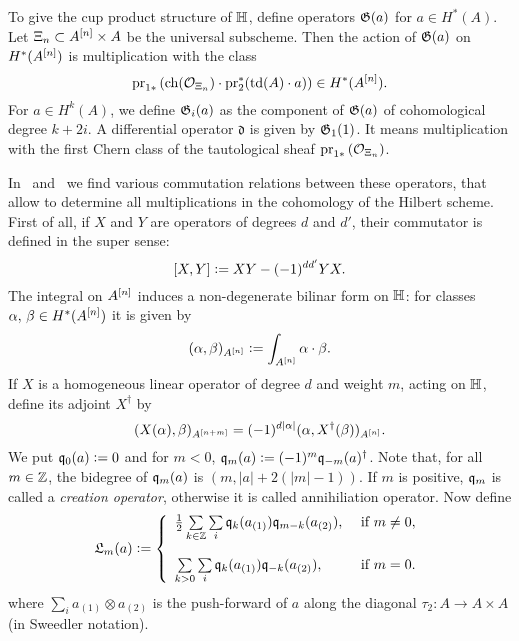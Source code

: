 \begin{definition}
To give the cup product structure of $\mathbb{H}$, define operators $\mathfrak{G}(a)$ for $a \in H^*(A)$. Let $\Xi_n \subset A^{[n]}\times A$ be the universal subscheme. Then the action of $\mathfrak{G}(a)$ on $H^*(A^{[n]})$ is multiplication with the class
$$
\operatorname{pr}_{1*}\left( \operatorname{ch}(\mathcal{O}_{\Xi_n})\cdot \operatorname{pr}_2^*(\operatorname{td}(A)\cdot a) \right) \in H^*(A^{[n]}).
$$
For $a \in H^k(A)$, we define $\mathfrak{G}_i(a)$ as the component of $\mathfrak{G}(a)$ of cohomological degree $k+2i$. A differential operator $\mathfrak{d}$ is given by $\mathfrak{G}_1(1)$. It means multiplication with the first Chern class of the tautological sheaf $\operatorname{pr}_{1*}\left( \mathcal{O}_{\Xi_n}\right)$.
\end{definition}
In~\cite{LehnSorger} and~\cite{LiQinWang} we find various commutation relations between these operators, that allow to determine all multiplications in the cohomology of the Hilbert scheme. First of all, if $X$ and $Y$ are operators of degrees $d$ and $d'$, their commutator is defined in the super sense: 
$$
[X,Y] \vcentcolon=  XY - (-1)^{dd'}YX.
$$
The integral on $A^{[n]}$ induces a non-degenerate bilinar form on $\mathbb{H}$: for classes $\alpha,\,\beta\in H^*(A^{[n]})$ it is given by
$$
(\alpha,\beta)_{A^{[n]}} \vcentcolon=   \int_{A^{[n]}}\alpha\cdot\beta.
$$
If $X$ is a homogeneous linear operator of degree $d$ and weight $m$, acting on $\mathbb{H}$, define its adjoint $X^\dagger$ by
$$
(X(\alpha),\beta)_{A^{[n+m]}}  = (-1)^{d|\alpha|}( \alpha , X^\dagger (\beta))_{A^{[n]}}.
$$
We put $\mathfrak{q}_0(a) \vcentcolon= 0$ and for $m<0$, $\mathfrak{q}_m(a) \vcentcolon=  (-1)^m \mathfrak{q}_{-m}(a)^\dagger$. Note that, for all $m\in\mathbb{Z}$, the bidegree of $\mathfrak{q}_m(a)$ is $(m,|a| + 2(|m|-1))$. If $m$ is positive, $\mathfrak{q}_m$ is called a \emph{creation operator}, otherwise it is called annihiliation operator. Now define
$$
\mathfrak{L}_m(a) \defIs  \left\{ 
\begin{array}{ll}
 \tfrac{1}{2}\sum\limits_{k\in\Z}\sum\limits_{i}\q_k( a_{(1)})\q_{m-k}( a_{(2)}), & \text{ if } m\neq 0, \vspace{4mm}\\
 \sum\limits_{k>0}\sum\limits_{i}\q_k( a_{(1)})\q_{-k}( a_{(2)}), & \text{ if } m= 0. \\
\end{array}
\right.
$$
where $\sum_i a_{(1)}\otimes  a_{(2)}$ is the push-forward of $a$ along the diagonal $\tau_2 :A \rightarrow A\times A$ (in Sweedler notation).
